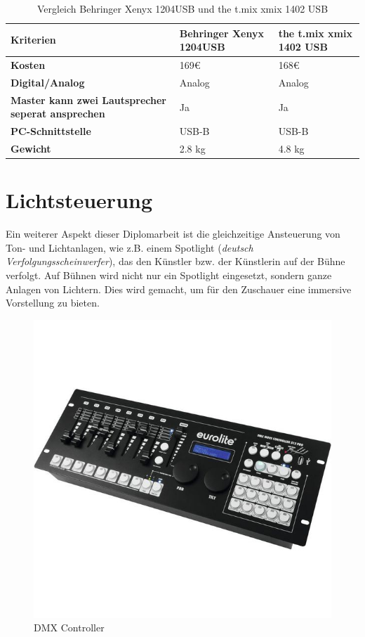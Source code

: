 \begin{table} [H]
	\begin{tabular}{ |p{3.1cm} |p{4.8cm}|p{4.8cm}| }
		\hline
		\textbf{Kriterien} & \textbf{Behringer Xenyx 1204USB}& \textbf{the t.mix xmix 1402 USB}\\
		\hline
		\textbf{Kosten} & 169€ & 168€  \\ 
		\hline
		\textbf{Digital/Analog} & Analog & Analog   \\  
		\hline
		\textbf{Master kann zwei Lautsprecher seperat ansprechen} & Ja & Ja \\
		\hline
		\textbf{PC-Schnittstelle} & USB-B & USB-B  \\
		\hline
		\textbf{Gewicht}& 2.8 kg & 4.8 kg \\
		\hline	
	\end{tabular}
	\caption{Vergleich Behringer Xenyx 1204USB und the t.mix xmix 1402 USB} 
\end{table} 

\section{Lichtsteuerung}
Ein weiterer Aspekt dieser Diplomarbeit ist die gleichzeitige Ansteuerung von Ton- und Lichtanlagen, wie z.B. einem Spotlight (\emph{deutsch Verfolgungsscheinwerfer}), das den Künstler bzw. der Künstlerin auf der Bühne verfolgt. Auf Bühnen wird nicht nur ein Spotlight eingesetzt, sondern ganze Anlagen von Lichtern. Dies wird gemacht, um für den Zuschauer eine immersive Vorstellung zu bieten. 

\begin{figure}[H]
	\centering
	\includegraphics[width=0.7\linewidth]{images/DMX_Controller.jpg}
	\caption[DMX Controller]{DMX Controller}
	\label{fig:DMX_Controller}
\end{figure}

